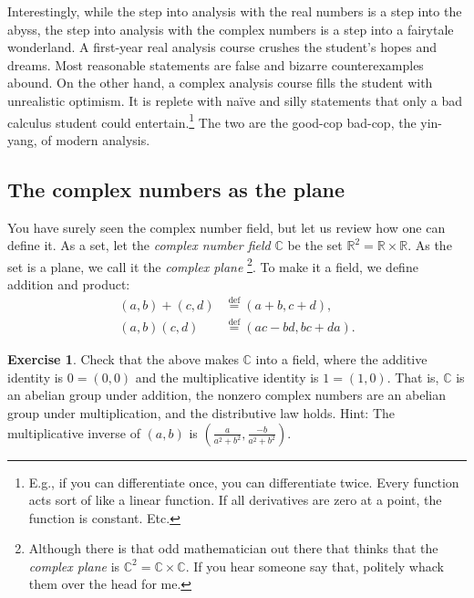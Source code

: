 \documentclass[12pt,openany]{book}
\newcommand{\C}{{\mathbb{C}}}
\newcommand{\R}{{\mathbb{R}}}
\newcommand{\myindex}[1]{#1\index{#1}}
\theoremstyle{plain}
\theoremstyle{remark}
\theoremstyle{definition}
\newenvironment{exbox}{%
    \def\FrameCommand{\vrule width 1pt \relax\hspace{10pt}}%
    \MakeFramed{\advance\hsize-\width\FrameRestore}%
}{%
    \endMakeFramed
}
\theoremstyle{exercise}
\newtheorem{exercise}{Exercise}[section]
\theoremstyle{example}
\begin{document}
Interestingly, while the step into analysis with the real numbers
is a step into the abyss, the step into analysis with the complex numbers is a
step into a fairytale wonderland.  A first-year real analysis course
crushes the student's hopes and dreams.  Most reasonable statements
are false and bizarre counterexamples abound.
On the other hand, a complex analysis course fills the student with
unrealistic optimism.  It is replete with na\"ive and silly statements
that only a bad calculus student could entertain.\footnote{%
E.g., if you can differentiate once, you can differentiate twice.
Every function acts sort of like a linear function.
If all derivatives are zero at a point, the function is constant.
Etc.}
The two are the good-cop bad-cop, the yin-yang,
of modern analysis.



\subsection{The complex numbers as the plane}

You have surely seen the complex number field,
but let us review how one can define it.
As a set, let the \emph{\myindex{complex number field}}
$\C$ be the set $\R^2 = \R \times \R$.
As the set is a plane, we call it the \emph{\myindex{complex plane}}%
\footnote{Although there is that odd mathematician out there that
thinks that the \emph{complex plane} is $\C^2 = \C \times \C$.
If you hear someone say that, politely whack them over the head for me.}.
To make it a field, we define addition and product:
\begin{align*}
(a,b) + (c,d) & \overset{\text{def}}{=} (a+b,c+d) , \\
(a,b) (c,d) & \overset{\text{def}}{=} (ac-bd,bc+da) .
\end{align*}

\begin{exbox}
\begin{exercise}
Check that the above makes $\C$ into a field, where the additive
identity is $0=(0,0)$ and the multiplicative identity is $1=(1,0)$.
That is, $\C$ is an abelian group under addition,
the nonzero complex numbers are an abelian group under multiplication,
and the distributive law holds.  Hint: The multiplicative inverse of $(a,b)$
is $\left(\frac{a}{a^2+b^2},\frac{-b}{a^2+b^2}\right)$.
\end{exercise}
\end{exbox}
\end{document}
